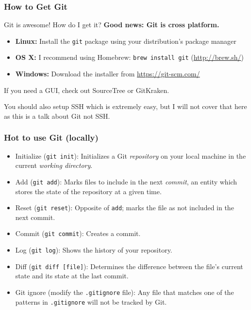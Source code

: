 \documentclass{beeper}
\begin{document}
\begin{frame}
    \frametitle{How to Get Git}

    Git is awesome! How do I get it? \textbf{Good news: Git is cross platform.}

    \begin{itemize}
        \item \textbf{Linux:} Install the \texttt{git} package using your
            distribution's package manager
        \item \textbf{OS X:} I recommend using Homebrew: \texttt{brew install git}
            (\url{http://brew.sh/})
        \item \textbf{Windows:} Download the installer from \url{https://git-scm.com/}
    \end{itemize}

    If you need a GUI, check out SourceTree or GitKraken.

    You should also setup SSH which is extremely easy, but I will not cover that
    here as this is a talk about Git not SSH.
\end{frame}

\begin{frame}
    \frametitle{Hot to use Git (locally)}

    \begin{itemize}
        \item Initialize (\texttt{git init}): Initializes a Git
            \textit{repository} on your local machine in the current
            \textit{working directory}.
        \item Add (\texttt{git add}): Marks files to include in the next
            \textit{commit}, an entity which stores the state of the repository
            at a given time.
        \item Reset (\texttt{git reset}): Opposite of \texttt{add}; marks the
            file as not included in the next commit.
        \item Commit (\texttt{git commit}): Creates a commit.
        \item Log (\texttt{git log}): Shows the history of your repository.
        \item Diff (\texttt{git diff [file]}): Determines the difference between
            the file's current state and its state at the last commit.
        \item Git ignore (modify the \texttt{.gitignore} file): Any file that
            matches one of the patterns in \texttt{.gitignore} will not be
            tracked by Git.
    \end{itemize}
\end{frame}
\end{document}
